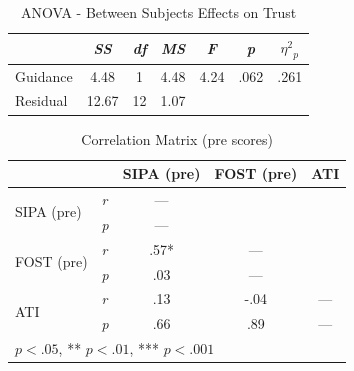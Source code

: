 \documentclass[11pt,a4paper,english]{scrreprt}
\begin{document}
\begin{table}[htbp]
    \centering
    \begin{tabularx}{0.6\textwidth}{ l c c c c c c }
        \toprule
        & \textit{SS} & \textit{df} & \textit{MS} & \textit{F} & \textit{p} & ${\eta^2}_p$ \\
        \midrule
        Guidance & 4.48 & 1 & 4.48 & 4.24 & .062 & .261 \\
        Residual & 12.67 & 12 & 1.07 & & & \\
        \bottomrule
    \end{tabularx}
    \caption{ANOVA - Between Subjects Effects on Trust}
    \label{table:anova_between_trust}
\end{table}

\begin{table}[htbp]
    \centering
    \begin{tabularx}{0.65\textwidth}{ l l c c c }
        \toprule
        & & SIPA (pre) & FOST (pre) & ATI \\
        \midrule
        \multirow[t]{2}{*}{SIPA (pre)} & \textit{r} & --- & & \\
        & \textit{p} & --- & & \\
        \multirow[t]{2}{*}{FOST (pre)} & \textit{r} & .57* & --- & \\
        & \textit{p} & .03 & --- & \\
        \multirow[t]{2}{*}{ATI} & \textit{r} & .13 & -.04 & --- \\
        & \textit{p} & .66 & .89 & --- \\
        \bottomrule
        \multicolumn{5}{l}{\footnotesize * $\textit{p}<.05$, ** $\textit{p}<.01$, *** $\textit{p}<.001$} \\
    \end{tabularx}
    \caption{Correlation Matrix (pre scores)}
    \label{table:correlation_matrix_pre}
\end{table}
\end{document}
